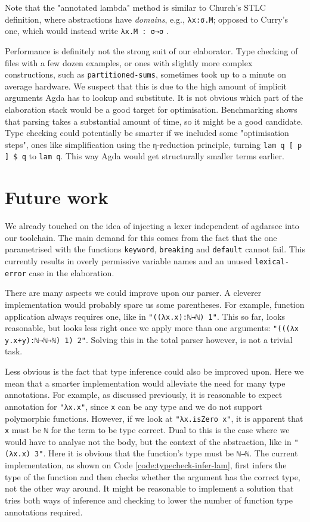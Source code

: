 Note that the "annotated lambda" method is similar to Church's STLC definition, where abstractions have \textit{domains}, e.g., \verb$λx:σ.M$; opposed to Curry's one, which would instead write \verb$λx.M : σ→σ$ \cite{sorensen1998curry}.

Performance is definitely not the strong suit of our elaborator. Type checking of files with a few dozen examples, or ones with slightly more complex constructions, such as \verb$partitioned-sums$, sometimes took up to a minute on average hardware. We suspect that this is due to the high amount of implicit arguments Agda has to lookup and substitute. It is not obvious which part of the elaboration stack would be a good target for optimisation. Benchmarking shows that parsing takes a substantial amount of time, so it might be a good candidate. Type checking could potentially be smarter if we included some "optimisation steps", ones like simplification using the \verb$η$-reduction principle, turning \verb$lam q [ p ] $\verb$$\verb=$=\verb$$\verb$ q$ to \verb$lam q$. This way Agda would get structurally smaller terms earlier.

\section{Future work}

We already touched on the idea of injecting a lexer independent of agdarsec into our toolchain. The main demand for this comes from the fact that the one parametrised with the functions \verb$keyword$, \verb$breaking$ and \verb$default$ cannot fail. This currently results in overly permissive variable names and an unused \verb$lexical-error$ case in the elaboration.

There are many aspects we could improve upon our parser. A cleverer implementation would probably spare us some parentheses. For example, function application always requires one, like in \verb$"((λx.x):ℕ→ℕ) 1"$. This so far, looks reasonable, but looks less right once we apply more than one arguments: \verb$"(((λx y.x+y):ℕ→ℕ→ℕ) 1) 2"$. Solving this in the total parser however, is not a trivial task.

Less obvious is the fact that type inference could also be improved upon. Here we mean that a smarter implementation would alleviate the need for many type annotations. For example, as discussed previously, it is reasonable to expect annotation for \verb$"λx.x"$, since \verb$x$ can be any type and we do not support polymorphic functions. However, if we look at \verb$"λx.isZero x"$, it is apparent that \verb$x$ must be \verb$ℕ$ for the term to be type correct. Dual to this is the case where we would have to analyse not the body, but the context of the abstraction, like in \verb$"(λx.x) 3"$. Here it is obvious that the function's type must be \verb$ℕ→ℕ$. The current implementation, as shown on Code \ref{code:typecheck-infer-lam}, first infers the type of the function and then checks whether the argument has the correct type, not the other way around. It might be reasonable to implement a solution that tries both ways of inference and checking to lower the number of function type annotations required.

